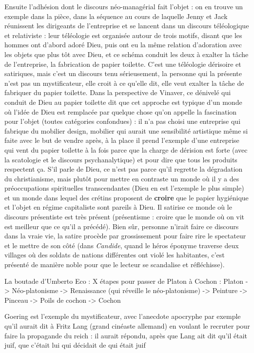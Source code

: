 \documentclass[a4paper,12pt]{book}
\begin{document}
\par Ensuite l'adhésion dont le discours néo-managérial fait l'objet : on en trouve un exemple dans la pièce, dans la séquence au cours de laquelle Jenny et Jack réunissent les dirigeants de l'entreprise et se lancent dans un discours téléologique et relativiste : leur téléologie est organisée autour de trois motifs, disant que les hommes ont d'abord adoré Dieu, puis ont eu la même relation d'adoration avec les objets que plus tôt avec Dieu, et ce schéma conduit les deux à exalter la tâche de l'entreprise, la fabrication de papier toilette. C'est une téléologie dérisoire et satiriques, mais c'est un discours tenu sérieusement, la personne qui la présente n'est pas un mystificateur, elle croit à ce qu'elle dit, elle veut exalter la tâche de fabriquer du papier toilette. Dans la perspective de Vinaver, ce dénivelé qui conduit de Dieu au papier toilette dit que cet approche est typique d'un monde où l'idée de Dieu est remplacée par quelque chose qu'on appelle la fascination pour l'objet (toutes catégories confondues) : il n'a pas choisi une entreprise qui fabrique du mobilier design, mobilier qui aurait une sensibilité artistique même si faite avec le but de vendre après, à la place il prend l'exemple d'une entreprise qui vent du papier toilette à la fois parce que la charge de dérision est forte (avec la scatologie et le discours psychanalytique) et pour dire que tous les produits respectent ça. S'il parle de Dieu, ce n'est pas parce qu'il regrette la dégradation du christianisme, mais plutôt pour mettre en contraste un monde où il y a des préoccupations spirituelles transcendantes (Dieu en est l'exemple le plus simple) et un monde dans lequel des crétins proposent de \textbf{croire} que le papier hygiénique et l'objet en régime capitaliste sont pareils à Dieu. Il satirise ce monde où le discours présentiste est très présent (présentisme : croire que le monde où on vit est meilleur que ce qu'il a précédé). Bien sûr, personne n'irait faire ce discours dans la vraie vie, la satire procède par grossissement pour faire rire le spectateur et le mettre de son côté (dans \textit{Candide}, quand le héros éponyme traverse deux villages où des soldats de nations différentes ont violé les habitantes, c'est présenté de manière noble pour que le lecteur se scandalise et réfléchisse).
\par La boutade d'Umberto Eco : X étapes pour passer de Platon à Cochon : Platon -> Néo-platonisme -> Renaissance (qui réveille le néo-platonisme) -> Peinture -> Pinceau -> Poils de cochon -> Cochon
\par Goering est l'exemple du mystificateur, avec l'anecdote apocryphe par exemple qu'il aurait dit à Fritz Lang (grand cinéaste allemand) en voulant le recruter pour faire la propagande du reich : il aurait répondu, après que Lang ait dit qu'il était juif, que c'était lui qui décidait de qui était juif
\end{document}
